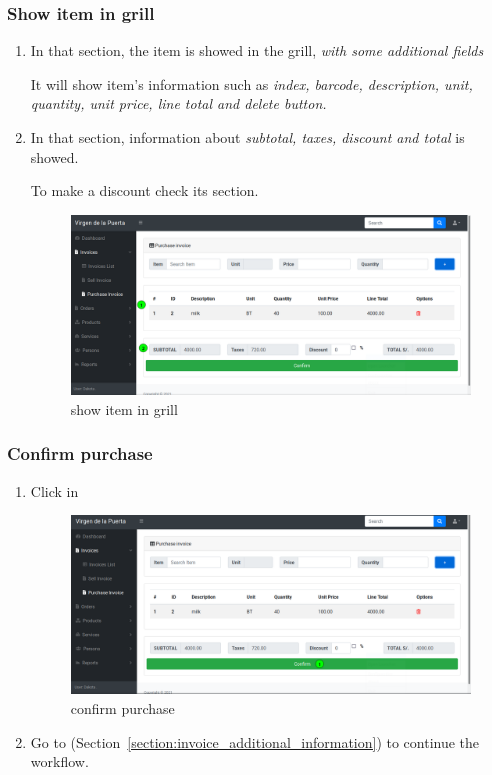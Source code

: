 \documentclass[a4paper,11pt]{refart}
\begin{document}
\subsubsection{Show item in grill}
\begin{enumerate}
	\item In that section, the item is showed in the grill,  \emph{with some additional fields}
	\medskip
	\begin{leftbar}
		It will show item's information such as \emph{ index, barcode, description, unit, quantity, unit price, line total and delete button.}
	\end{leftbar}
	\item In that section, information about \emph{subtotal, taxes, discount and total} is showed.
	\medskip
	\begin{leftbar}
		To make a discount check its section.
	\end{leftbar}
	\begin{figure}[H]\centering
		\includegraphics[width=\textwidth]{images/invoice_purchase-grill.png}
		\caption{show item in grill}\label{fig:invoice_purchase-grill}
	\end{figure}
\end{enumerate}

\subsubsection{Confirm purchase}
\begin{enumerate}
	\item Click in  
	\begin{figure}[H]\centering
		\includegraphics[width=\textwidth]{images/invoice_purchase-confirm.png}
		\caption{confirm purchase}
		\label{fig:invoice_purchase-confirm}
	\end{figure}
	\item Go to (Section~\ref{section:invoice_additional_information}) to continue the workflow.
\end{enumerate}
\end{document}
